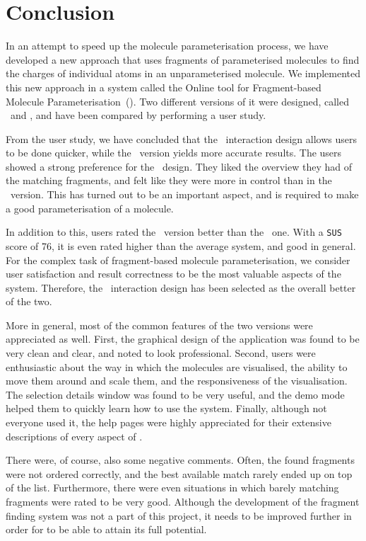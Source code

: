 \chapter{Conclusion}

In an attempt to speed up the molecule parameterisation process, we have developed a new approach that uses fragments of parameterised molecules to find the charges of individual atoms in an unparameterised molecule. We implemented this new approach in a system called the Online tool for Fragment-based Molecule Parameterisation~(\oframp). Two different versions of it were designed, called \IDa\ and \IDb, and have been compared by performing a user study.

From the user study, we have concluded that the \IDb\ interaction design allows users to be done quicker, while the \IDa\ version yields more accurate results. The users showed a strong preference for the \IDa\ design. They liked the overview they had of the matching fragments, and felt like they were more in control than in the \IDb\ version. This has turned out to be an important aspect, and is required to make a good parameterisation of a molecule.

In addition to this, users rated the \IDa\ version better than the \IDb\ one. With a \verb|SUS| score of 76, it is even rated higher than the average system, and good in general. For the complex task of fragment-based molecule parameterisation, we consider user satisfaction and result correctness to be the most valuable aspects of the system. Therefore, the \IDa\ interaction design has been selected as the overall better of the two.

More in general, most of the common features of the two versions were appreciated as well. First, the graphical design of the application was found to be very clean and clear, and noted to look professional. Second, users were enthusiastic about the way in which the molecules are visualised, the ability to move them around and scale them, and the responsiveness of the visualisation. The selection details window was found to be very useful, and the demo mode helped them to quickly learn how to use the system. Finally, although not everyone used it, the help pages were highly appreciated for their extensive descriptions of every aspect of \oframp.

There were, of course, also some negative comments. Often, the found fragments were not ordered correctly, and the best available match rarely ended up on top of the list. Furthermore, there were even situations in which barely matching fragments were rated to be very good. Although the development of the fragment finding system was not a part of this project, it needs to be improved further in order for \oframp{} to be able to attain its full potential.

